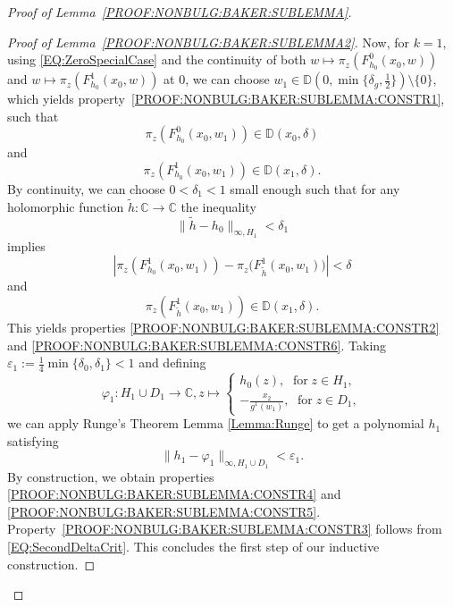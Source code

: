 \documentclass[a4paper, 12pt, twoside]{amsart}
\theoremstyle{definition}
\numberwithin{equation}{section}
\newcommand{\C}{{\mathbb C}}
\newcommand{\D}{{\mathbb D}}
\renewcommand{\phi}{\varphi}
\begin{document}
\begin{proof}[Proof of Lemma~\ref{PROOF:NONBULG:BAKER:SUBLEMMA}]
\begin{proof}[Proof of Lemma~\ref{PROOF:NONBULG:BAKER:SUBLEMMA2}]
            Now, for $k = 1$, using \eqref{EQ:ZeroSpecialCase} and the continuity of both $w \mapsto \pi_z (F^0_{h_{0}}(x_0,w))$ and $w \mapsto \pi_z (F^1_{h_{0}}(x_0,w))$ at $0$, we can choose $w_1 \in \D({0,\min\{\delta_g, \frac{1}{2}\}}) \setminus \{0\}$, which yields property~\eqref{PROOF:NONBULG:BAKER:SUBLEMMA:CONSTR1}, such that
            \begin{equation*}
                \pi_z (F^0_{h_{0}}(x_0,w_1)) \in \D(x_0,\delta)
            \end{equation*}
            and
            \begin{equation*}
                \pi_z (F^1_{h_{0}}(x_0,w_1)) \in \D(x_1,\delta).
            \end{equation*}
            By continuity, we can choose $0 < \delta_1 < 1$ small enough such that for any holomorphic function $\widetilde{h} : \C \to \C$ the inequality
            \begin{equation*}
                \|{\widetilde{h} - h_{0}}\|_{\infty, H_{1}} < \delta_{1}
            \end{equation*}
            implies
            \begin{equation*}
                |{\pi_z( F^{1}_{h_{0}}(x_0, w_{1})) - \pi_z (F^{1}_{\widetilde{h}}(x_0, w_{1})})| < \delta
            \end{equation*}
            and
            \begin{equation}\label{EQ:SecondDeltaCrit}
                \pi_z( F^{1}_{\widetilde{h}}(x_0, w_{1})) \in \D(x_{1}, \delta).
            \end{equation}
            This yields properties \eqref{PROOF:NONBULG:BAKER:SUBLEMMA:CONSTR2} and \eqref{PROOF:NONBULG:BAKER:SUBLEMMA:CONSTR6}.
            Taking $\varepsilon_1 := \frac{1}{4} \min\{\delta_0, \delta_1\} < 1$ and defining
            \begin{equation*}
                \phi_{1} : H_{1} \cup D_{1} \to \C, z \mapsto \begin{cases}
                    h_{0}(z),\;\text{ for}\; z\in H_{1},\\
                    -\frac{x_{2}}{g^{1}(w_{1})},\;\text{ for}\;z \in D_{1},
                \end{cases}
            \end{equation*}
            we can apply Runge's Theorem Lemma \ref{Lemma:Runge} to get a polynomial $h_1$ satisfying 
            \begin{equation*}
                \|{h_1 - \phi_1}\|_{\infty, H_1 \cup D_1} < \varepsilon_1.
            \end{equation*}
            By construction, we obtain properties \eqref{PROOF:NONBULG:BAKER:SUBLEMMA:CONSTR4} and \eqref{PROOF:NONBULG:BAKER:SUBLEMMA:CONSTR5}. Property~\eqref{PROOF:NONBULG:BAKER:SUBLEMMA:CONSTR3} follows from \eqref{EQ:SecondDeltaCrit}. This concludes the first step of our inductive construction.


\end{proof}
\end{proof}
\end{document}
